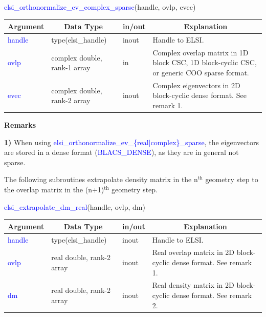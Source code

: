 \documentclass{report}
\newcommand{\tcb}[1]{\textcolor{blue}{#1}}
\begin{document}
\begin{labeling}{\hspace{6cm}}
\item [\hspace{0.3cm} \tcb{elsi\_orthonormalize\_ev\_complex\_sparse}(handle, ovlp, evec)]
\end{labeling}

\begin{tabular}[]{|p{20mm}|p{45mm}|p{15mm}|p{85mm}|}
\hline
\multicolumn{1}{|c|}{\textbf{Argument}} & \multicolumn{1}{c|}{\textbf{Data Type}} & \multicolumn{1}{c|}{\textbf{in/out}} & \multicolumn{1}{c|}{\textbf{Explanation}}\\
\hline
\tcb{handle} & type(elsi\_handle)           & inout & Handle to ELSI.\\
\hline
\tcb{ovlp}   & complex double, rank-1 array & in    & Complex overlap matrix in 1D block CSC, 1D block-cyclic CSC, or generic COO sparse format.\\
\hline
\tcb{evec}   & complex double, rank-2 array & inout & Complex eigenvectors in 2D block-cyclic dense format. See remark 1.\\
\hline
\end{tabular}

\textbf{Remarks}

\textbf{1)} When using \tcb{elsi\_orthonormalize\_ev\_\{real$\vert$complex\}\_sparse}, the eigenvectors are stored in a dense format (\tcb{BLACS\_DENSE}), as they are in general not sparse.

The following subroutines extrapolate density matrix in the n$^\text{th}$ geometry step to the overlap matrix in the (n+1)$^\text{th}$ geometry step.

\begin{labeling}{\hspace{6cm}}
\item [\hspace{0.3cm} \tcb{elsi\_extrapolate\_dm\_real}(handle, ovlp, dm)]
\end{labeling}

\begin{tabular}[]{|p{20mm}|p{45mm}|p{15mm}|p{85mm}|}
\hline
\multicolumn{1}{|c|}{\textbf{Argument}} & \multicolumn{1}{c|}{\textbf{Data Type}} & \multicolumn{1}{c|}{\textbf{in/out}} & \multicolumn{1}{c|}{\textbf{Explanation}}\\
\hline
\tcb{handle} & type(elsi\_handle)        & inout & Handle to ELSI.\\
\hline
\tcb{ovlp}   & real double, rank-2 array & inout & Real overlap matrix in 2D block-cyclic dense format. See remark 1.\\
\hline
\tcb{dm}     & real double, rank-2 array & inout & Real density matrix in 2D block-cyclic dense format. See remark 2.\\
\hline
\end{tabular}
\end{document}
